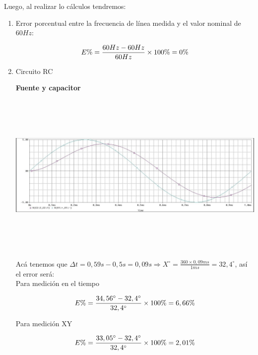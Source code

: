 \documentclass[12pt]{article}
\begin{document}
	\noindent Luego, al realizar lo cálculos tendremos:
	
	\renewcommand{\theenumi}{\alph{enumi}} %
	
	\begin{enumerate}
		\item Error porcentual entre la frecuencia de línea medida y el valor nominal de $60Hz$:
		
		\begin{equation}
			\notag E\% = \frac{60Hz - 60Hz}{60Hz}\times 100\% = 0\%
		\end{equation}
	
		\item Circuito RC
		
		\noindent \textbf{Fuente y capacitor}
		
		\begin{center}
			\includegraphics[width=16cm,height=8cm]{Img/spice_c_source}
		\end{center}
		
		\noindent Acá tenemos que $\Delta t = 0,59s - 0,5s = 0,09s\Rightarrow X^\circ = \frac{360 \times 0,09ms}{1ms} = 32,4^\circ$, así el error será:\\
		
		\noindent Para medición en el tiempo
		
		\begin{equation}
			\notag E\% = \frac{34,56^\circ - 32,4^\circ}{32,4^\circ}\times 100\% = 6,66\%
		\end{equation}
	
		\noindent Para medición XY
		
		\begin{equation}
			\notag E\% = \frac{33,05^\circ - 32,4^\circ}{32,4^\circ}\times 100\% = 2,01\%
		\end{equation}
	

\end{enumerate}
\end{document}
